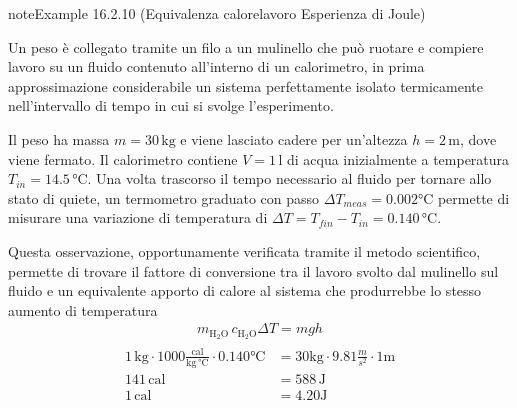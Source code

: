 \documentclass[letterpaper,10pt,italian]{jupyterBook}
\begin{document}
\begin{sphinxadmonition}{note}{Example 16.2.10 (Equivalenza calore\sphinxhyphen{}lavoro \sphinxhyphen{} Esperienza di Joule)}



\sphinxAtStartPar
Un peso è collegato tramite un filo a un mulinello che può ruotare e compiere lavoro su un fluido contenuto all’interno di un calorimetro, in prima approssimazione considerabile un sistema perfettamente isolato termicamente nell’intervallo di tempo in cui si svolge l’esperimento.

\sphinxAtStartPar
Il peso ha massa \(m = 30 \, \text{kg}\) e viene lasciato cadere per un’altezza \(h = 2 \, \text{m}\), dove viene fermato. Il calorimetro contiene \(V = 1 \, \text{l}\) di acqua inizialmente a temperatura \(T_{in} = 14.5 \, \text{°C}\). Una volta trascorso il tempo necessario al fluido per tornare allo stato di quiete, un termometro graduato con passo \(\Delta T_{meas} = 0.002 \text{°C}\) permette di misurare una variazione di temperatura di \(\Delta T = T_{fin} - T_{in} = 0.140 \, \text{°C}\).

\sphinxAtStartPar
Questa osservazione, opportunamente verificata tramite il metodo scientifico, permette di trovare il fattore di conversione tra il lavoro svolto dal mulinello sul fluido e un equivalente apporto di calore al sistema che produrrebbe lo stesso aumento di temperatura
\begin{equation*}
\begin{split}m_{\text{H$_2$O}} \, c_{\text{H$_2$O}} \Delta T = m g h\end{split}
\end{equation*}\begin{equation*}
\begin{split}\begin{aligned}
  1 \, \text{kg} \cdot 1000 \frac{\text{cal}}{\text{kg} \, \text{°C}} \cdot 0.140 \text{°C} & = 30 \text{kg} \cdot 9.81 \frac{m}{s^2} \cdot 1 \text{m} \\
  141 \, \text{cal} & = 588 \, \text{J} \\
  1 \, \text{cal} & = 4.20 \text{J}
\end{aligned}\end{split}
\end{equation*}\end{sphinxadmonition}
\label{ch/thermodynamics/foundation-experiments:thermodynamics:history:heat-work:second}
\end{document}
